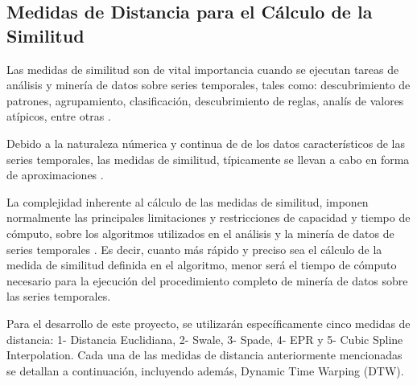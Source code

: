 \subsection{Medidas de Distancia para el C\'alculo de la Similitud}
Las medidas de similitud son de vital importancia cuando se ejecutan tareas de an\'alisis y miner\'ia de datos sobre series temporales, tales como: descubrimiento de patrones, agrupamiento, clasificaci\'on, descubrimiento de reglas, anal\'is de valores at\'ipicos, entre otras \cite{concepts}.\par
Debido a la naturaleza n\'umerica y continua de de los datos caracter\'isticos de las series temporales, las medidas de similitud, t\'ipicamente se llevan a cabo en forma de aproximaciones \cite{distancecomparison}.\par
La complejidad inherente al c\'alculo de las medidas de similitud, imponen normalmente las principales limitaciones y restricciones de capacidad y tiempo de c\'omputo, sobre los algoritmos utilizados en el an\'alisis y la miner\'ia de datos de series temporales \cite{algoanalysis}. Es decir, cuanto m\'as r\'apido y preciso sea el c\'alculo de la medida de similitud definida en el algoritmo, menor ser\'a el tiempo de c\'omputo necesario para la ejecuci\'on del procedimiento completo de miner\'ia de datos sobre las series temporales.\par
Para el desarrollo de este proyecto, se utilizar\'an espec\'ificamente cinco medidas de distancia: 1- Distancia Euclidiana, 2- Swale, 3- Spade, 4- EPR y 5- Cubic Spline Interpolation. Cada una de las medidas de distancia anteriormente mencionadas se detallan a continuaci\'on, incluyendo adem\'as, Dynamic Time Warping (DTW).

